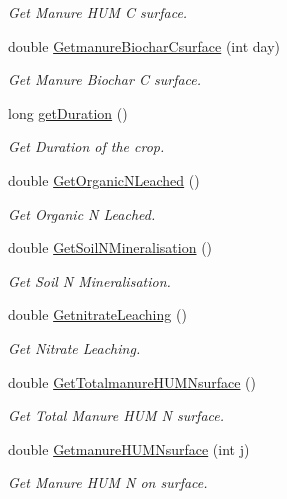 \begin{DoxyCompactItemize}
\begin{DoxyCompactList}\small\item\em Get Manure H\+UM C surface. \end{DoxyCompactList}\item 
double \mbox{\hyperlink{class_crop_class_a0de8f90d381ca211a8faf2baa876b40d}{Getmanure\+Biochar\+Csurface}} (int day)
\begin{DoxyCompactList}\small\item\em Get Manure Biochar C surface. \end{DoxyCompactList}\item 
long \mbox{\hyperlink{class_crop_class_af38f276503873c6a87777f9607b6b451}{get\+Duration}} ()
\begin{DoxyCompactList}\small\item\em Get Duration of the crop. \end{DoxyCompactList}\item 
double \mbox{\hyperlink{class_crop_class_a3dffe78f0226cc2e1370203db374a148}{Get\+Organic\+N\+Leached}} ()
\begin{DoxyCompactList}\small\item\em Get Organic N Leached. \end{DoxyCompactList}\item 
double \mbox{\hyperlink{class_crop_class_aad6835cd38f0a070983bade11afd9df1}{Get\+Soil\+N\+Mineralisation}} ()
\begin{DoxyCompactList}\small\item\em Get Soil N Mineralisation. \end{DoxyCompactList}\item 
double \mbox{\hyperlink{class_crop_class_aeb2eee357240757e0e68099cffea54fa}{Getnitrate\+Leaching}} ()
\begin{DoxyCompactList}\small\item\em Get Nitrate Leaching. \end{DoxyCompactList}\item 
double \mbox{\hyperlink{class_crop_class_a1848a82c987f5eccbf4d937bafd3f5a1}{Get\+Totalmanure\+H\+U\+M\+Nsurface}} ()
\begin{DoxyCompactList}\small\item\em Get Total Manure H\+UM N surface. \end{DoxyCompactList}\item 
double \mbox{\hyperlink{class_crop_class_a5fe271fc582346c1baf45adfa643db78}{Getmanure\+H\+U\+M\+Nsurface}} (int j)
\begin{DoxyCompactList}\small\item\em Get Manure H\+UM N on surface. \end{DoxyCompactList}\item 

\end{DoxyCompactItemize}

